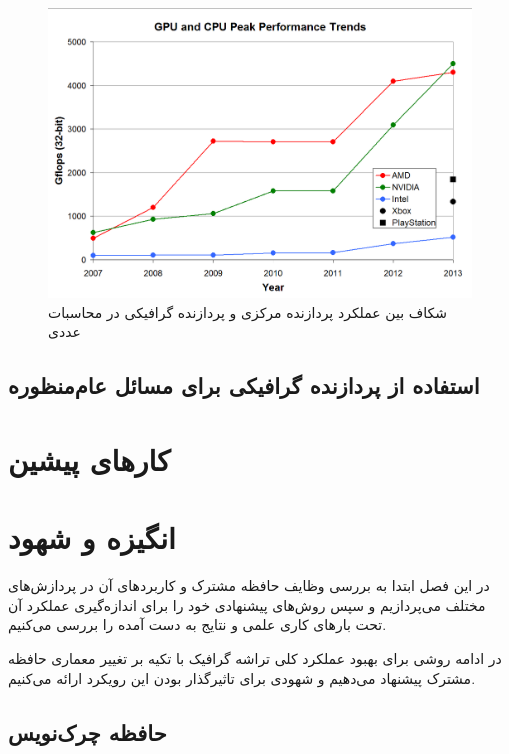 \documentclass{thesis}
\begin{document}
\begin{figure}[h]
\centering
\includegraphics[width=\textwidth]{./pics/6}
\caption{شکاف بین عملکرد پردازنده مرکزی و پردازنده گرافیکی در محاسبات عددی}
\label{cpugpuperformancegap}
\end{figure}

\section{
استفاده از پردازنده گرافیکی برای مسائل عام‌منظوره
}


\chapter{
کارهای پیشین
}

\chapter{
انگیزه و شهود
}

در این فصل ابتدا به بررسی وظایف حافظه مشترک و کاربرد‌های آن در پردازش‌های مختلف
می‌پردازیم و سپس روش‌های پیشنهادی خود را برای اندازه‌گیری عملکرد آن تحت بارهای
کاری علمی و نتایج به دست آمده را بررسی می‌کنیم.

در ادامه روشی برای بهبود عملکرد کلی تراشه گرافیک با تکیه بر تغییر معماری حافظه
مشترک پیشنهاد می‌دهیم و شهودی برای تاثیرگذار بودن این رویکرد ارائه می‌کنیم.

\section{
حافظه چرک‌نویس
}
\end{document}
